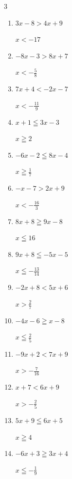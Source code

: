 \begin{multicols}{3}
\begin{enumerate}
  \item $3x-8>4x+9$

        $\displaystyle x<-17$

  \item $-8x-3>8x+7$

        $\displaystyle x<-\frac{5}{8}$

  \item $7x+4<-2x-7$

        $\displaystyle x<-\frac{11}{9}$

  \item $x+1\leqq 3x-3$

        $\displaystyle x\geqq 2$

  \item $-6x-2\leqq 8x-4$

        $\displaystyle x\geqq \frac{1}{7}$

\columnbreak %

  \item $-x-7>2x+9$

        $\displaystyle x<-\frac{16}{3}$

  \item $8x+8\geqq 9x-8$

        $\displaystyle x\leqq 16$

  \item $9x+8\leqq -5x-5$

        $\displaystyle x\leqq -\frac{13}{14}$

  \item $-2x+8<5x+6$

        $\displaystyle x>\frac{2}{7}$

  \item $-4x-6\geqq x-8$

        $\displaystyle x\leqq \frac{2}{5}$

  \item $-9x+2<7x+9$

        $\displaystyle x>-\frac{7}{16}$

  \item $x+7<6x+9$

        $\displaystyle x>-\frac{2}{5}$

  \item $5x+9\leqq 6x+5$

        $\displaystyle x\geqq 4$

  \item $-6x+3\geqq 3x+4$

        $\displaystyle x\leqq -\frac{1}{9}$


\end{enumerate}
\end{multicols}
